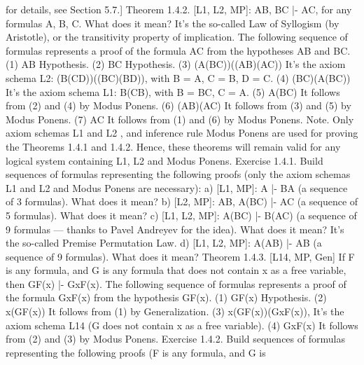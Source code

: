 for details, see Section 5.7.]
Theorem 1.4.2. [L1, L2, MP]: A\IMPLIES B, B\IMPLIES C |- A\IMPLIES C, for any formulas A, B, C. What does it mean? It's
the so-called Law of Syllogism (by Aristotle), or the transitivity property of implication.
The following sequence of formulas represents a proof of the formula A\IMPLIES C from the hypotheses A\IMPLIES B
and B\IMPLIES C.
(1) A\IMPLIES B
Hypothesis.
(2) B\IMPLIES C Hypothesis.
(3) (A\IMPLIES (B\IMPLIES C))\IMPLIES ((A\IMPLIES B)\IMPLIES (A\IMPLIES C)) It's the axiom schema L2:
                                       (B\IMPLIES (C\IMPLIES D))\IMPLIES ((B\IMPLIES C)\IMPLIES (B\IMPLIES D)), with B =
                                                  A, C = B, D = C.
(4) (B\IMPLIES C)\IMPLIES (A\IMPLIES (B\IMPLIES C)) It's the axiom schema L1: B\IMPLIES (C\IMPLIES B), with B
                               = B\IMPLIES C, C = A.
(5) A\IMPLIES (B\IMPLIES C) It follows from (2) and (4) by Modus Ponens.
(6) (A\IMPLIES B)\IMPLIES (A\IMPLIES C) It follows from (3) and (5) by Modus Ponens.
(7) A\IMPLIES C It follows from (1) and (6) by Modus Ponens.
Note. Only axiom schemas L1 and L2 , and inference rule Modus Ponens are used for proving the
Theorems 1.4.1 and 1.4.2. Hence, these theorems will remain valid for any logical system containing
L1, L2 and Modus Ponens.
Exercise 1.4.1. Build sequences of formulas representing the following proofs (only the axiom schemas
L1 and L2 and Modus Ponens are necessary):
a) [L1, MP]: A |- B\IMPLIES A (a sequence of 3 formulas). What does it mean?
b) [L2, MP]: A\IMPLIES B, A\IMPLIES (B\IMPLIES C) |- A\IMPLIES C (a sequence of 5 formulas). What does it mean?
c) [L1, L2, MP]: A\IMPLIES (B\IMPLIES C) |- B\IMPLIES (A\IMPLIES C) (a sequence of 9 formulas --- thanks to Pavel Andreyev for the
idea). What does it mean? It's the so-called Premise Permutation Law.
d) [L1, L2, MP]: A\IMPLIES (A\IMPLIES B) |- A\IMPLIES B (a sequence of 9 formulas). What does it mean?
Theorem 1.4.3. [L14, MP, Gen] If F is any formula, and G is any formula that does not contain x as a free
variable, then
G\IMPLIES F(x) |- G\IMPLIES \forall xF(x).
The following sequence of formulas represents a proof of the formula G\IMPLIES \forall xF(x) from the hypothesis
G\IMPLIES F(x).
(1) G\IMPLIES F(x) Hypothesis.
(2) \forall x(G\IMPLIES F(x)) It follows from (1) by Generalization.
(3) \forall x(G\IMPLIES F(x))\IMPLIES (G\IMPLIES \forall xF(x)), It's the axiom schema L14 (G does not
                                    contain x as a free variable).
(4) G\IMPLIES \forall xF(x) It follows from (2) and (3) by Modus Ponens.
Exercise 1.4.2. Build sequences of formulas representing the following proofs (F is any formula, and G is
